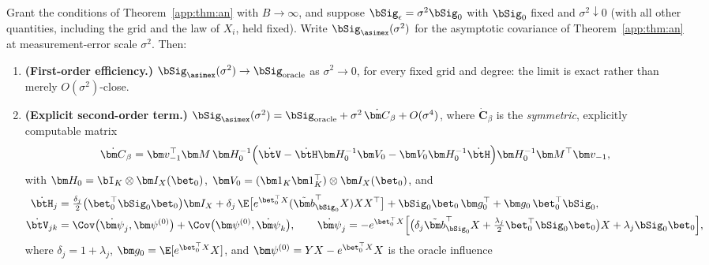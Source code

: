 \begin{theorem}\label{app:thm:are}
Grant the conditions of Theorem~\ref{app:thm:an} with $B\to\infty$, and
suppose $\bSig_\epsilon=\sigma^2\bSig_0$ with $\bSig_0$ fixed and
$\sigma^2\downarrow0$ (with all other quantities, including the grid and
the law of $X_i$, held fixed). Write
$\bSig_{\asimex}(\sigma^2)$ for the asymptotic covariance of
Theorem~\ref{app:thm:an} at measurement-error scale $\sigma^2$. Then:
\begin{enumerate}\itemsep2pt
\item[(i)] \textbf{(First-order efficiency.)}
      $\bSig_{\asimex}(\sigma^2)\to\bSig_{\mathrm{oracle}}$
      as $\sigma^2\to0$, for every fixed grid and degree: the limit is
      exact rather than merely $O(\sigma^2)$-close.
\item[(ii)] \textbf{(Explicit second-order term.)}
      $\bSig_{\asimex}(\sigma^2)
      =\bSig_{\mathrm{oracle}}+\sigma^2\,\dot{\bm C}_\beta+O(\sigma^4)$,
      where $\dot{\bm C}_\beta$ is the \emph{symmetric}, explicitly
      computable matrix
      \begin{equation}\label{app:eq:cdot}
        \dot{\bm C}_\beta
        =\bm v_{-1}^\top\bm M\,\bm H_0^{-1}
        \Bigl(\dot{\btV}-\dot{\btH}\bm H_0^{-1}\bm V_0
              -\bm V_0\bm H_0^{-1}\dot{\btH}\Bigr)
        \bm H_0^{-1}\bm M^\top\bm v_{-1},
      \end{equation}
      with $\bm H_0=\bI_K\otimes\bm I_X(\bet_0)$,
      $\bm V_0=(\bm 1_K\bm 1_K^\top)\otimes\bm I_X(\bet_0)$, and
      \begin{align}
        \dot{\btH}_j
        &=\tfrac{\delta_j}{2}\bigl(\bet_0^\top\bSig_0\bet_0\bigr)\bm I_X
          +\delta_j\,\E\bigl[e^{\bet_0^\top X}
             (\tilde{\bm b}_{\bSig_0}^\top X)XX^\top\bigr]
          +\bSig_0\bet_0\,\bm g_0^\top+\bm g_0\,\bet_0^\top\bSig_0,
          \label{app:eq:hdot}\\
        \dot{\btV}_{jk}
        &=\Cov\bigl(\dot{\bm\psi}_j,\bm\psi^{(0)}\bigr)
         +\Cov\bigl(\bm\psi^{(0)},\dot{\bm\psi}_k\bigr),
        \qquad
        \dot{\bm\psi}_j
        =-e^{\bet_0^\top X}
         \Bigl[\bigl(\delta_j\tilde{\bm b}_{\bSig_0}^\top X
                +\tfrac{\lambda_j}{2}\bet_0^\top\bSig_0\bet_0\bigr)X
               +\lambda_j\bSig_0\bet_0\Bigr],
        \label{app:eq:vdot}
      \end{align}
      where $\delta_j=1+\lambda_j$,
      $\bm g_0=\E[e^{\bet_0^\top X}X]$, and
      $\bm\psi^{(0)}=YX-e^{\bet_0^\top X}X$ is the oracle influence

\end{enumerate}
\end{theorem}
